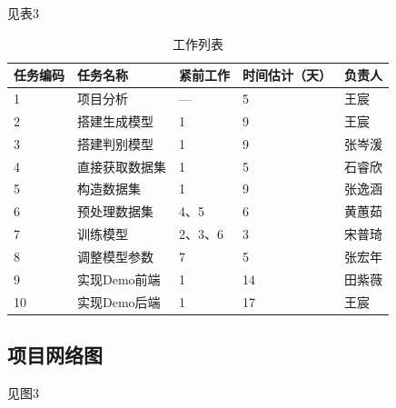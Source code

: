 \documentclass[
  hyperref, a4paper]{ctexart}
\begin{document}
见表3

\begin{table}
    \caption{工作列表}
    \begin{tabular}{|p{2.0cm}<{\centering}|p{2.0cm}<{\centering}|p{2.0cm}<{\centering}|p{2.0cm}<{\centering}|p{2.0cm}<{\centering}|}
    \hline
    任务编码 & 任务名称     & 紧前工作  & 时间估计（天） & 负责人 \\ \hline
    1    & 项目分析     & —     & 5       & 王宸  \\ \hline
    2    & 搭建生成模型   & 1     & 9       & 王宸  \\ \hline
    3    & 搭建判别模型   & 1     & 9       & 张岑湲 \\ \hline
    4    & 直接获取数据集  & 1     & 5       & 石睿欣 \\ \hline
    5    & 构造数据集    & 1     & 9       & 张逸涵 \\ \hline
    6    & 预处理数据集   & 4、5   & 6       & 黄蕙茹 \\ \hline
    7    & 训练模型     & 2、3、6 & 3       & 宋普琦 \\ \hline
    8    & 调整模型参数   & 7     & 5       & 张宏年 \\ \hline
    9    & 实现Demo前端 & 1     & 14      & 田紫薇 \\ \hline
    10   & 实现Demo后端 & 1     & 17      & 王宸  \\ \hline
    \end{tabular}
\end{table}

\hypertarget{ux9879ux76eeux7f51ux7edcux56fe}{%
\subsection{项目网络图}\label{ux9879ux76eeux7f51ux7edcux56fe}}

见图3
\end{document}
